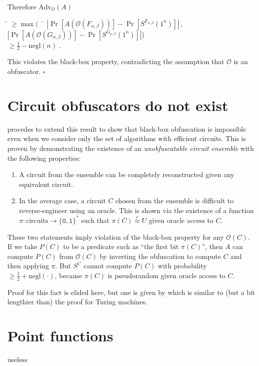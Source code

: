 \documentclass[10pt,twocolumn]{article}
\newcommand{\abs}[1]{{\ensuremath{\left\vert#1\right\vert}}}
\def\zero{\texttt{0}}
\def\one{\texttt{1}}
\def\bit{{\ensuremath{\{\zero,\one\}}}}
\def\obf{\ensuremath{\mathcal{O}}}
\def\negl{\text{negl}}
\def\cind{{\ensuremath{\stackrel{c}{\approx}}}}
\def\Adv{\text{Adv}}
\def\qed{\hfill \ensuremath{\square}}
\begin{document}
    Therefore $\Adv_\obf(A)$
    \begin{tabbing}
      \hspace{2em} \= $\ge \max(\;\;$ \= $\abs{ \Pr[ A(\obf(F_{\alpha,\beta})) ] - \Pr[ S^{F_{\alpha,\beta}}(1^n) ] }$\,, \\[5pt]
                   \>                 \> $\abs{ \Pr[ A(\obf(G_{\alpha,\beta})) ] - \Pr[ S^{G_{\alpha,\beta}}(1^n) ] }$\;\;) \\[5pt]
                   \> $\ge \frac{1}{2} - \negl(n)$ .
    \end{tabbing}
    This violates the black-box property, contradicting the assumption that $\obf$ is an obfuscator. \qed

    \section{Circuit obfuscators do not exist}

    \cite{onThe(Im)possibility} procedes to extend this result to show that black-box obfuscation is
    impossible even when we consider only the set of algorithms with efficient circuits.
    This is proven by demonstrating the existence of an \textit{unobfuscatable circuit ensemble}
    with the following properties:%

    \begin{enumerate}
      \item A circuit from the ensemble can be completely reconstructed given any equivalent circuit.
      \item In the average case, a circuit $C$ chosen from the ensemble is difficult to reverse-engineer using an oracle.
      This is shown via the existence of a function $\pi: \text{circuits}\to\bit^*$ such that $\pi(C)\cind U$
      given oracle access to $C$.
    \end{enumerate}

    These two statements imply violation of the black-box property for any $\obf(C)$.
    If we take $P(C)$ to be a predicate such as ``the first bit $\pi(C)$'',
    then $A$ can compute $P(C)$ from $\obf(C)$ by inverting the obfuscation to compute $C$ and then applying $\pi$.
    But $S^C$ cannot compute $P(C)$ with probability $\ge \frac{1}{2}+\negl(\cdot)$,
    because $\pi(C)$ is pseudorandom given oracle access to $C$.

    Proof for this fact is elided here, but one is given by \cite{onThe(Im)possibility}
    which is similar to (but a bit lengthier than) the proof for Turing machines.

  \section{Point functions}

    useless

  
  
\end{document}
